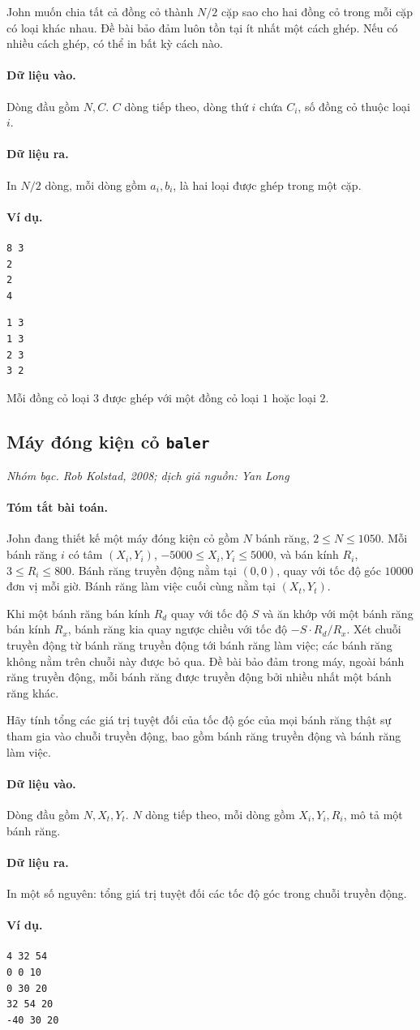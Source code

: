 \documentclass[11pt]{article}
\newcommand{\problem}[4]{%
  \subsection[#1 (#2)]{#1 \hfill {\normalsize\texttt{#2}}}%
  \noindent\textit{#3. #4}\par\smallskip
}
\newcommand{\iosec}[1]{\paragraph{#1}}
\begin{document}
John muốn chia tất cả đồng cỏ thành \(N/2\) cặp sao cho hai đồng cỏ trong mỗi
cặp có loại khác nhau. Đề bài bảo đảm luôn tồn tại ít nhất một cách ghép. Nếu
có nhiều cách ghép, có thể in bất kỳ cách nào.

\iosec{Dữ liệu vào.}
Dòng đầu gồm \(N,C\). \(C\) dòng tiếp theo, dòng thứ \(i\) chứa \(C_i\), số
đồng cỏ thuộc loại \(i\).

\iosec{Dữ liệu ra.}
In \(N/2\) dòng, mỗi dòng gồm \(a_i,b_i\), là hai loại được ghép trong một
cặp.

\iosec{Ví dụ.}
\begin{verbatim}
8 3
2
2
4
\end{verbatim}

\begin{verbatim}
1 3
1 3
2 3
3 2
\end{verbatim}

Mỗi đồng cỏ loại \(3\) được ghép với một đồng cỏ loại \(1\) hoặc loại \(2\).

\problem{Máy đóng kiện cỏ}{baler}{Nhóm bạc}{Rob Kolstad, 2008; dịch giả nguồn: Yan Long}

\iosec{Tóm tắt bài toán.}
John đang thiết kế một máy đóng kiện cỏ gồm \(N\) bánh răng,
\(2\le N\le 1050\). Mỗi bánh răng \(i\) có tâm \((X_i,Y_i)\),
\(-5000\le X_i,Y_i\le 5000\), và bán kính \(R_i\),
\(3\le R_i\le 800\). Bánh răng truyền động nằm tại \((0,0)\), quay với tốc
độ góc \(10000\) đơn vị mỗi giờ. Bánh răng làm việc cuối cùng nằm tại
\((X_t,Y_t)\).

Khi một bánh răng bán kính \(R_d\) quay với tốc độ \(S\) và ăn khớp với một
bánh răng bán kính \(R_x\), bánh răng kia quay ngược chiều với tốc độ
\(-S\cdot R_d/R_x\). Xét chuỗi truyền động từ bánh răng truyền động tới bánh
răng làm việc; các bánh răng không nằm trên chuỗi này được bỏ qua. Đề bài bảo
đảm trong máy, ngoài bánh răng truyền động, mỗi bánh răng được truyền động bởi
nhiều nhất một bánh răng khác.

Hãy tính tổng các giá trị tuyệt đối của tốc độ góc của mọi bánh răng thật sự
tham gia vào chuỗi truyền động, bao gồm bánh răng truyền động và bánh răng
làm việc.

\iosec{Dữ liệu vào.}
Dòng đầu gồm \(N,X_t,Y_t\). \(N\) dòng tiếp theo, mỗi dòng gồm
\(X_i,Y_i,R_i\), mô tả một bánh răng.

\iosec{Dữ liệu ra.}
In một số nguyên: tổng giá trị tuyệt đối các tốc độ góc trong chuỗi truyền
động.

\iosec{Ví dụ.}
\begin{verbatim}
4 32 54
0 0 10
0 30 20
32 54 20
-40 30 20
\end{verbatim}
\end{document}
